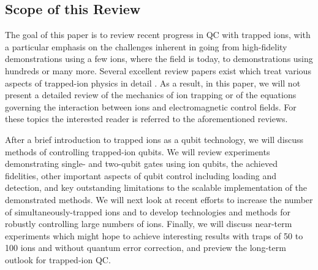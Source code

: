 \documentclass[%
12pt,
 amsmath,amssymb,
]{revtex4-2}
\begin{document}

\subsection{Scope of this Review}

The goal of this paper is to review recent progress in QC with trapped ions, with a particular emphasis on the challenges inherent in going from high-fidelity demonstrations using a few ions, where the field is today, to demonstrations using hundreds or many more. Several excellent review papers exist which treat various aspects of trapped-ion physics in detail \cite{Wineland1998, leibfried2003quantum, Blatt:Wine:Nat08, HaffnerIonReview2008, WinelandIonReview2009, ozeri_tutorial_2011, SchindlerIonReview2013}. As a result, in this paper, we will not present a detailed review of the mechanics of ion trapping or of the equations governing the interaction between ions and electromagnetic control fields. For these topics the interested reader is referred to the aforementioned reviews.

After a brief introduction to trapped ions as a qubit technology, we will discuss methods of controlling trapped-ion qubits. We will review experiments demonstrating single- and two-qubit gates using ion qubits, the achieved fidelities, other important aspects of qubit control including loading and detection, and key outstanding limitations to the scalable implementation of the demonstrated methods. We will next look at recent efforts to increase the number of simultaneously-trapped ions and to develop technologies and methods for robustly controlling large numbers of ions. Finally, we will discuss near-term experiments which might hope to achieve interesting results with traps of 50 to 100 ions and without quantum error correction, and preview the long-term outlook for trapped-ion QC.
\end{document}
